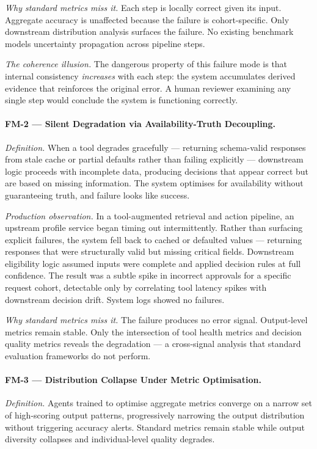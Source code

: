 \documentclass{article}
\begin{document}
\textit{Why standard metrics miss it.}  Each step is locally correct given its
input.  Aggregate accuracy is unaffected because the failure is
cohort-specific.  Only downstream distribution analysis surfaces the failure.
No existing benchmark models uncertainty propagation across pipeline steps.

\textit{The coherence illusion.}  The dangerous property of this failure mode
is that internal consistency \emph{increases} with each step: the system
accumulates derived evidence that reinforces the original error.  A human
reviewer examining any single step would conclude the system is functioning
correctly.

\paragraph{FM-2 --- Silent Degradation via Availability-Truth Decoupling.}
\textit{Definition.}  When a tool degrades gracefully --- returning
schema-valid responses from stale cache or partial defaults rather than failing
explicitly --- downstream logic proceeds with incomplete data, producing
decisions that appear correct but are based on missing information.  The system
optimises for availability without guaranteeing truth, and failure looks like
success.

\textit{Production observation.}  In a tool-augmented retrieval and action
pipeline, an upstream profile service began timing out intermittently.  Rather
than surfacing explicit failures, the system fell back to cached or defaulted
values --- returning responses that were structurally valid but missing critical
fields.  Downstream eligibility logic assumed inputs were complete and applied
decision rules at full confidence.  The result was a subtle spike in incorrect
approvals for a specific request cohort, detectable only by correlating tool
latency spikes with downstream decision drift.  System logs showed no failures.

\textit{Why standard metrics miss it.}  The failure produces no error signal.
Output-level metrics remain stable.  Only the intersection of tool health
metrics and decision quality metrics reveals the degradation --- a cross-signal
analysis that standard evaluation frameworks do not perform.

\paragraph{FM-3 --- Distribution Collapse Under Metric Optimisation.}
\textit{Definition.}  Agents trained to optimise aggregate metrics converge on
a narrow set of high-scoring output patterns, progressively narrowing the
output distribution without triggering accuracy alerts.  Standard metrics
remain stable while output diversity collapses and individual-level quality
degrades.
\end{document}

